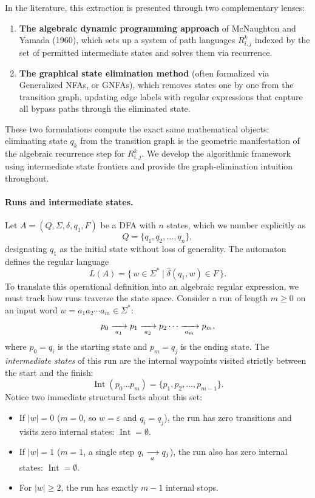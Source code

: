In the literature, this extraction is presented through two complementary lenses:
\begin{enumerate}[leftmargin=1.4em, nosep]
  \item \textbf{The algebraic dynamic programming approach} of McNaughton and Yamada (1960), which sets up a system of path languages $R_{i,j}^k$ indexed by the set of permitted intermediate states and solves them via recurrence.
  \item \textbf{The graphical state elimination method} (often formalized via Generalized NFAs, or GNFAs), which removes states one by one from the transition graph, updating edge labels with regular expressions that capture all bypass paths through the eliminated state.
\end{enumerate}
These two formulations compute the exact same mathematical objects: eliminating state $q_k$ from the transition graph is the geometric manifestation of the algebraic recurrence step for $R_{i,j}^k$. We develop the algorithmic framework using intermediate state frontiers and provide the graph-elimination intuition throughout.

\paragraph{Runs and intermediate states.}
Let $A = (Q, \Sigma, \delta, q_1, F)$ be a DFA with $n$ states, which we number explicitly as
\[
  Q = \{q_1, q_2, \ldots, q_n\},
\]
designating $q_1$ as the initial state without loss of generality.
The automaton defines the regular language
\[
  L(A) = \{\,w \in \Sigma^* \mid \widehat{\delta}(q_1, w) \in F\,\}.
\]
To translate this operational definition into an algebraic regular expression, we must track how runs traverse the state space. Consider a run of length $m \ge 0$ on an input word $w = a_1 a_2 \cdots a_m \in \Sigma^*$:
\[
  p_0 \xrightarrow[{\;a_1\;}]{} p_1 \xrightarrow[{\;a_2\;}]{} p_2 \cdots \xrightarrow[{\;a_m\;}]{} p_m,
\]
where $p_0 = q_i$ is the starting state and $p_m = q_j$ is the ending state. The \emph{intermediate states} of this run are the internal waypoints visited strictly between the start and the finish:
\[
  \operatorname{Int}(p_0 \dots p_m) = \{p_1, p_2, \ldots, p_{m-1}\}.
\]
Notice two immediate structural facts about this set:
\begin{itemize}[leftmargin=1.2em, nosep]
  \item If $|w| = 0$ ($m=0$, so $w = \varepsilon$ and $q_i = q_j$), the run has zero transitions and visits zero internal states: $\operatorname{Int} = \emptyset$.
  \item If $|w| = 1$ ($m=1$, a single step $q_i \xrightarrow[{\;a\;}]{} q_j$), the run also has zero internal states: $\operatorname{Int} = \emptyset$.
  \item For $|w| \ge 2$, the run has exactly $m-1$ internal stops.
\end{itemize}

